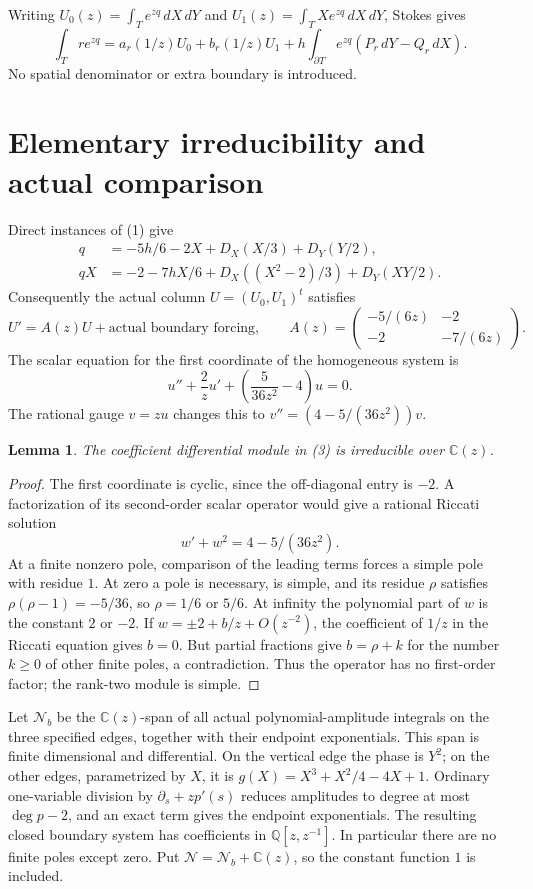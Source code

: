\documentclass[11pt]{article}
\newtheorem{lemma}[theorem]{Lemma}
\newcommand{\Q}{\mathbb Q}
\newcommand{\C}{\mathbb C}
\begin{document}
Writing $U_0(z)=\int_Te^{zq}\,dX\,dY$ and
$U_1(z)=\int_TXe^{zq}\,dX\,dY$, Stokes gives
\[
 \int_T r e^{zq}=a_r(1/z)U_0+b_r(1/z)U_1+
 h\int_{\partial T}e^{zq}(P_r\,dY-Q_r\,dX).       \tag{2}
\]
No spatial denominator or extra boundary is introduced.

\section{Elementary irreducibility and actual comparison}
Direct instances of (1) give
\begin{align*}
 q&=-5h/6-2X+D_X(X/3)+D_Y(Y/2),\\
 qX&=-2-7hX/6+D_X((X^2-2)/3)+D_Y(XY/2).
\end{align*}
Consequently the actual column $U=(U_0,U_1)^t$ satisfies
\[
 U'=A(z)U+\text{actual boundary forcing},\qquad
 A(z)=\begin{pmatrix}-5/(6z)&-2\\-2&-7/(6z)\end{pmatrix}. \tag{3}
\]
The scalar equation for the first coordinate of the homogeneous system is
\[
 u''+\frac2z u'+\left(\frac5{36z^2}-4\right)u=0.
\]
The rational gauge $v=zu$ changes this to
$v''=(4-5/(36z^2))v$.

\begin{lemma}\label{lem:irred}
The coefficient differential module in (3) is irreducible over $\C(z)$.
\end{lemma}
\begin{proof}
The first coordinate is cyclic, since the off-diagonal entry is $-2$.
A factorization of its second-order scalar operator would give a rational
Riccati solution
\[
 w'+w^2=4-5/(36z^2).
\]
At a finite nonzero pole, comparison of the leading terms forces a simple
pole with residue $1$. At zero a pole is necessary, is simple, and its
residue $\rho$ satisfies $\rho(\rho-1)=-5/36$, so
$\rho=1/6$ or $5/6$. At infinity the polynomial part of $w$ is the
constant $2$ or $-2$. If $w=\pm2+b/z+O(z^{-2})$, the coefficient of $1/z$
in the Riccati equation gives $b=0$. But partial fractions give
$b=\rho+k$ for the number $k\ge0$ of other finite poles, a contradiction.
Thus the operator has no first-order factor; the rank-two module is simple.
\end{proof}

Let $\mathcal N_b$ be the $\C(z)$-span of all actual polynomial-amplitude
integrals on the three specified edges, together with their endpoint
exponentials. This span is finite dimensional and differential. On the
vertical edge the phase is $Y^2$; on the other edges, parametrized by $X$,
it is $g(X)=X^3+X^2/4-4X+1$. Ordinary one-variable division by
$\partial_s+zp'(s)$ reduces amplitudes to degree at most $\deg p-2$,
and an exact term gives the endpoint exponentials. The resulting closed
boundary system has coefficients in $\Q[z,z^{-1}]$. In particular there
are no finite poles except zero. Put $\mathcal N=\mathcal N_b+\C(z)$,
so the constant function $1$ is included.
\end{document}
